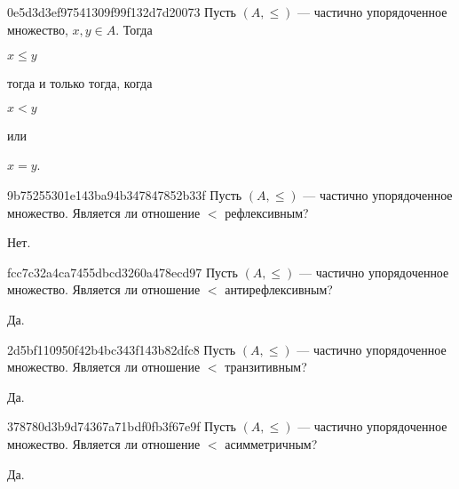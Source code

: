 \begin{note}{0e5d3d3ef97541309f99f132d7d20073}
    Пусть \({ (A, \leqslant) }\) --- частично упорядоченное множество, \({ x, y \in A }\).
    Тогда \begin{icloze}{2}\({ x \leqslant y }\)\end{icloze} \begin{icloze}{3}тогда и только тогда, когда\end{icloze} \begin{icloze}{1}\({ x < y }\)\end{icloze} или \begin{icloze}{1}\({ x = y }\).\end{icloze}
\end{note}

\begin{note}{9b75255301e143ba94b347847852b33f}
    Пусть \({ (A, \leqslant) }\) --- частично упорядоченное множество.
    Является ли отношение \({ < }\) рефлексивным?

    \begin{cloze}{1}
        Нет.
    \end{cloze}
\end{note}

\begin{note}{fcc7c32a4ca7455dbcd3260a478ecd97}
    Пусть \({ (A, \leqslant) }\) --- частично упорядоченное множество.
    Является ли отношение \({ < }\) антирефлексивным?

   \begin{cloze}{1}
       Да.
   \end{cloze}
\end{note}

\begin{note}{2d5bf110950f42b4bc343f143b82dfc8}
    Пусть \({ (A, \leqslant) }\) --- частично упорядоченное множество.
    Является ли отношение \({ < }\) транзитивным?

    \begin{cloze}{1}
        Да.
    \end{cloze}
\end{note}

\begin{note}{378780d3b9d74367a71bdf0fb3f67e9f}
    Пусть \({ (A, \leqslant) }\) --- частично упорядоченное множество.
    Является ли отношение \({ < }\) асимметричным?

    \begin{cloze}{1}
        Да.
    \end{cloze}
\end{note}

